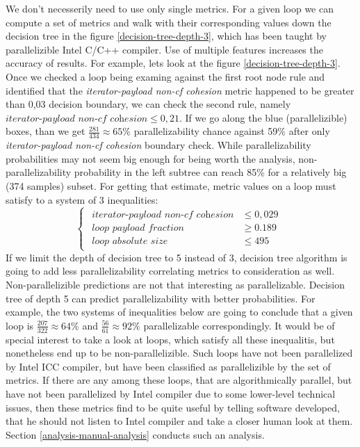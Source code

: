 \null\qquad We don't necesserily need to use only single metrics. For a given loop we can compute a set of metrics and walk with their corresponding values down the decision tree in the figure \ref{decision-tree-depth-3}, which has been taught by parallelizible Intel C/C++ compiler. Use of multiple features increases the accuracy of results. For example, lets look at the figure \ref{decision-tree-depth-3}. Once we checked a loop being examing against the first root node rule and identified that the \textit{iterator-payload non-cf cohesion} metric happened to be greater than 0,03 decision boundary, we can check the second rule, namely $\textit{iterator-payload non-cf cohesion}\leq 0,21$. If we go along the blue (parallelizible) boxes, than we get $\frac{281}{434}\approx 65\%$ parallelizability chance against 59\% after only \textit{iterator-payload non-cf cohesion} boundary check. While parallelizability probabilities may not seem big enough for being worth the analysis, non-parallelizability probability in the left subtree can reach 85\% for a relatively big (374 samples) subset. For getting that estimate, metric values on a loop must satisfy to a system of 3 inequalities:\newline
\begin{equation*}
\begin{cases}
\begin{aligned}
\textit{iterator-payload non-cf cohesion}            &\le 0,029 \\[1ex]
\textit{loop payload fraction} &\ge 0.189 \\[1ex]
\textit{loop absolute size} &\leq 495
\end{aligned}
\end{cases}
\end{equation*}\newline
\null\qquad If we limit the depth of decision tree to 5 instead of 3, decision tree algorithm is going to add less parallelizability correlating metrics to consideration as well. Non-parallelizible predictions are not that interesting as parallelizable. Decision tree of depth 5 can predict parallelizability with better probabilities. For example, the two systems of inequalities below are going to conclude that a given loop is $\frac{207}{322}\approx 64\%$ and $\frac{56}{61}\approx 92\%$ parallelizable correspondingly.\newline
\null\qquad It would be of special interest to take a look at loops, which satisfy all these inequalitis, but nonetheless end up to be non-parallelizible. Such loops have not been parallelized by Intel ICC compiler, but have been classified as parallelizible by the set of metrics. If there are any among these loops, that are algorithmically parallel, but have not been parallelized by Intel compiler due to some lower-level technical issues, then these metrics find to be quite useful by telling software developed, that he should not listen to Intel compiler and take a closer human look at them. Section \ref{analysis-manual-analysis} conducts such an analysis.
